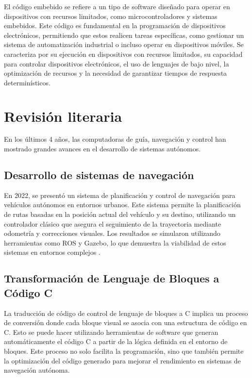 El código embebido se refiere a un tipo de software diseñado para operar en dispositivos con recursos limitados, como microcontroladores y sistemas embebidos. 
Este código es fundamental en la programación de dispositivos electrónicos, permitiendo que estos realicen tareas específicas, como gestionar un sistema de 
automatización industrial o incluso operar en dispositivos móviles. Se caracteriza por su ejecución en dispositivos con recursos limitados, su capacidad 
para controlar dispositivos electrónicos, el uso de lenguajes de bajo nivel, la optimización de recursos y la necesidad de garantizar tiempos de respuesta 
determinísticos.

\section{Revisión literaria}
En los últimos 4 años, las computadoras de guía, navegación y control han mostrado grandes avances en el desarrollo de sistemas autónomos.

\subsection{Desarrollo de sistemas de navegación}

En 2022, se presentó un sistema de planificación y control de navegación para vehículos autónomos en entornos urbanos. Este sistema permite la planificación 
de rutas basadas en la posición actual del vehículo y su destino, utilizando un controlador clásico que asegura el seguimiento de la trayectoria mediante 
odometría y correcciones visuales. Los resultados se simularon utilizando herramientas como ROS y Gazebo, lo que demuestra la viabilidad de estos sistemas en 
entornos complejos \cite{BarreraRamrez2022SistemaDP}. 

\subsection{Transformación de Lenguaje de Bloques a Código C}

La traducción de código de control de lenguaje de bloques a C implica un proceso de conversión donde cada bloque visual se asocia con una estructura de código 
en C. Esto se puede hacer utilizando herramientas de software que generan automáticamente el código C a partir de la lógica definida en el entorno de bloques. 
Este proceso no solo facilita la programación, sino que también permite la optimización del código generado para mejorar el rendimiento en sistemas de navegación 
autónoma.

